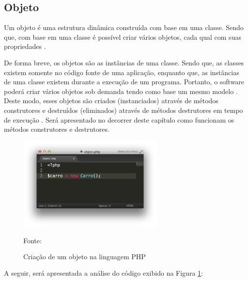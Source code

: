 \subsection{Objeto}

Um objeto é uma estrutura dinâmica construída com base em uma classe. Sendo que,
com base em uma classe é possível criar vários objetos, cada qual com suas
propriedades \cite{phpProgramandoComOrientacaoAObjetos}.

De forma breve, os objetos são as instâncias de uma classe. Sendo que, as
classes existem somente no código fonte de uma aplicação, enquanto que, as
instâncias de uma classe existem durante a execução de um programa. Portanto,
o software poderá criar vários objetos sob demanda tendo como base um mesmo
modelo \cite{ios7ProgrammingFundamentalsObjectiveCXcodeAndCocoaBasics}. Deste
modo, esses objetos são criados (instanciados) através de métodos construtores
e destruídos (eliminados) através de métodos destrutores em tempo de execução
\cite{umlEC++GuiaPraticoDeDesenvolvimentoOrientadoAObjeto}. Será apresentado no
decorrer deste capítulo como funcionam os métodos construtores e destrutores.

\begin{figure}[h!tb]
	\caption{Criação de um objeto na linguagem PHP}
	\label{fig:objeto}

	\centering
	\includegraphics[width=0.65\textwidth]{images/object.png}

	\centering
	\footnotesize Fonte: \fonteOAutor
\end{figure}

\FloatBarrier 	%

A seguir, será apresentada a análise do código exibido na
Figura \ref{fig:objeto}:

